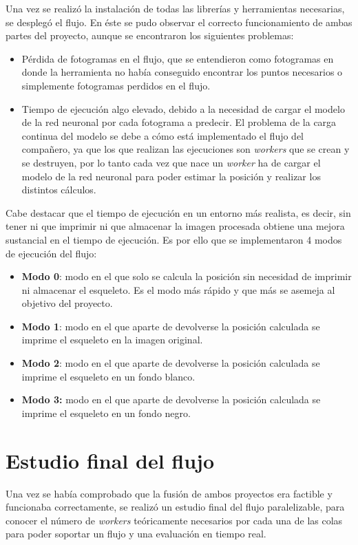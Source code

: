 {Una vez se realizó la instalación de todas las librerías y herramientas necesarias, se desplegó el flujo. En éste se pudo observar el correcto funcionamiento de ambas partes del proyecto, aunque se encontraron los siguientes problemas:
\begin{itemize}
	\item Pérdida de fotogramas en el flujo, que se entendieron como fotogramas en donde la herramienta no había conseguido encontrar los puntos necesarios o simplemente fotogramas perdidos en el flujo.
	\item Tiempo de ejecución algo elevado, debido a la necesidad de cargar el modelo de la red neuronal por cada fotograma a predecir. El problema de la carga continua del modelo se debe a cómo está implementado el flujo del compañero, ya que los que realizan las ejecuciones son \textit{workers} que se crean y se destruyen, por lo tanto cada vez que nace un \textit{worker} ha de cargar el modelo de la red neuronal para poder estimar la posición y realizar los distintos cálculos.
\end{itemize}

Cabe destacar que el tiempo de ejecución en un entorno más realista, es decir, sin tener ni que imprimir ni que almacenar la imagen procesada obtiene una mejora sustancial en el tiempo de ejecución. Es por ello que se implementaron 4 modos de ejecución del flujo:
\begin{itemize}
	\item \textbf{Modo 0}: modo en el que solo se calcula la posición sin necesidad de imprimir ni almacenar el esqueleto. Es el modo más rápido y que más se asemeja al objetivo del proyecto.
	\item \textbf{Modo 1}: modo en el que aparte de devolverse la posición calculada se imprime el esqueleto en la imagen original.
	\item \textbf{Modo 2}: modo en el que aparte de devolverse la posición calculada se imprime el esqueleto en un fondo blanco.
	\item \textbf{Modo 3:} modo en el que aparte de devolverse la posición calculada se imprime el esqueleto en un fondo negro.
\end{itemize}

\section{Estudio final del flujo}
Una vez se había comprobado que la fusión de ambos proyectos era factible y funcionaba correctamente, se realizó un estudio final del flujo paralelizable, para conocer el número de \textit{workers} teóricamente necesarios por cada una de las colas para poder soportar un flujo y una evaluación en tiempo real.

}

